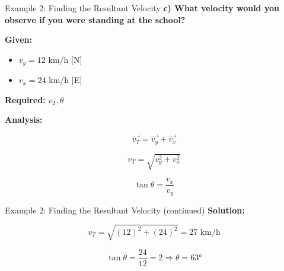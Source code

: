 \documentclass{beamer}
\begin{document}
\begin{frame}{Example 2: Finding the Resultant Velocity}
\textbf{c) What velocity would you observe if you were standing at the school?}
 
\vspace{0.3cm}

\textbf{Given:}
\begin{itemize}
\item \(v_y = 12\) km/h [N]
\item \(v_x = 24\) km/h [E]
\end{itemize}
 

\textbf{Required:} \(v_T, \theta\)
 
\vspace{0.3cm}

\textbf{Analysis:} 
 
\[\vec{v_T} = \vec{v_y} + \vec{v_x}\]
 
\[v_T = \sqrt{v_y^2 + v_x^2}\]
 
\[\tan\theta = \frac{v_x}{v_y}\]
\end{frame}

\begin{frame}{Example 2: Finding the Resultant Velocity (continued)}
\textbf{Solution:}
 
\[v_T = \sqrt{(12)^2 + (24)^2} = 27 \text{ km/h}\]
 
\[\tan\theta = \frac{24}{12} = 2 \Rightarrow \theta = 63°\]
 
\begin{center}
\end{center}
\end{frame}
\end{document}
